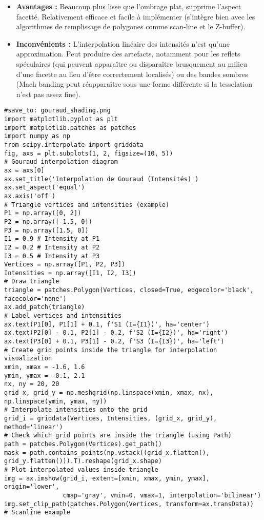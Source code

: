 \begin{itemize}
    \item \textbf{Avantages :} Beaucoup plus lisse que l'ombrage plat, supprime l'aspect facetté. Relativement efficace et facile à implémenter (s'intègre bien avec les algorithmes de remplissage de polygones comme scan-line et le Z-buffer).
    \item \textbf{Inconvénients :} L'interpolation linéaire des intensités n'est qu'une approximation. Peut produire des artefacts, notamment pour les reflets spéculaires (qui peuvent apparaître ou disparaître brusquement au milieu d'une facette au lieu d'être correctement localisés) ou des bandes sombres (Mach banding peut réapparaître sous une forme différente si la tesselation n'est pas assez fine).
\end{itemize}
\begin{verbatim}
#save_to: gouraud_shading.png
import matplotlib.pyplot as plt
import matplotlib.patches as patches
import numpy as np
from scipy.interpolate import griddata
fig, axs = plt.subplots(1, 2, figsize=(10, 5))
# Gouraud interpolation diagram
ax = axs[0]
ax.set_title('Interpolation de Gouraud (Intensités)')
ax.set_aspect('equal')
ax.axis('off')
# Triangle vertices and intensities (example)
P1 = np.array([0, 2])
P2 = np.array([-1.5, 0])
P3 = np.array([1.5, 0])
I1 = 0.9 # Intensity at P1
I2 = 0.2 # Intensity at P2
I3 = 0.5 # Intensity at P3
Vertices = np.array([P1, P2, P3])
Intensities = np.array([I1, I2, I3])
# Draw triangle
triangle = patches.Polygon(Vertices, closed=True, edgecolor='black', facecolor='none')
ax.add_patch(triangle)
# Label vertices and intensities
ax.text(P1[0], P1[1] + 0.1, f'S1 (I={I1})', ha='center')
ax.text(P2[0] - 0.1, P2[1] - 0.2, f'S2 (I={I2})', ha='right')
ax.text(P3[0] + 0.1, P3[1] - 0.2, f'S3 (I={I3})', ha='left')
# Create grid points inside the triangle for interpolation visualization
xmin, xmax = -1.6, 1.6
ymin, ymax = -0.1, 2.1
nx, ny = 20, 20
grid_x, grid_y = np.meshgrid(np.linspace(xmin, xmax, nx), np.linspace(ymin, ymax, ny))
# Interpolate intensities onto the grid
grid_i = griddata(Vertices, Intensities, (grid_x, grid_y), method='linear')
# Check which grid points are inside the triangle (using Path)
path = patches.Polygon(Vertices).get_path()
mask = path.contains_points(np.vstack((grid_x.flatten(), grid_y.flatten())).T).reshape(grid_x.shape)
# Plot interpolated values inside triangle
img = ax.imshow(grid_i, extent=[xmin, xmax, ymin, ymax], origin='lower',
                cmap='gray', vmin=0, vmax=1, interpolation='bilinear')
img.set_clip_path(patches.Polygon(Vertices, transform=ax.transData))
# Scanline example

\end{verbatim}
